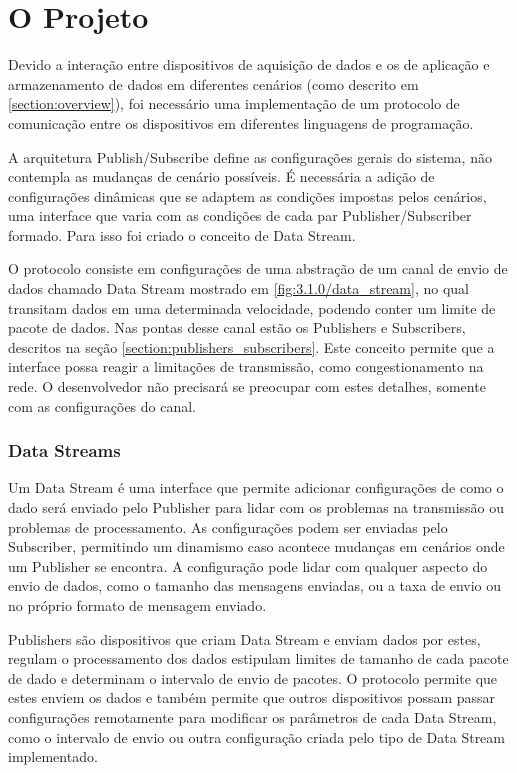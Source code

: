 \chapter{O Projeto}
\label{chapter:projeto}

Devido a interação entre dispositivos de aquisição de dados e os de aplicação e armazenamento de dados em diferentes cenários (como descrito em \ref{section:overview}), foi necessário uma implementação de um protocolo de comunicação entre os dispositivos em diferentes linguagens de programação.

A arquitetura Publish/Subscribe define as configurações gerais do sistema, não contempla as mudanças de cenário possíveis. É necessária a adição de configurações dinâmicas que se adaptem as condições impostas pelos cenários, uma interface que varia com as condições de cada par Publisher/Subscriber formado. Para isso foi criado o conceito de Data Stream.

O protocolo consiste em configurações de uma abstração de um canal de envio de dados chamado Data Stream mostrado em \ref{fig:3.1.0/data_stream}, no qual transitam dados em uma determinada velocidade, podendo conter um limite de pacote de dados. Nas pontas desse canal estão os Publishers e Subscribers, descritos na seção \ref{section:publishers_subscribers}. Este conceito permite  que a interface possa reagir a limitações de transmissão, como congestionamento na rede. O desenvolvedor não precisará se preocupar com estes detalhes, somente com as configurações do canal.


\subsection{Data Streams}
\label{section:data_stream}

Um Data Stream é uma interface que permite adicionar configurações de como o dado será enviado pelo Publisher  para lidar com os problemas na transmissão ou problemas de processamento. As configurações podem ser enviadas pelo Subscriber, permitindo um dinamismo caso acontece mudanças em cenários onde um Publisher se encontra. A configuração pode lidar com qualquer aspecto do envio de dados, como o tamanho das mensagens enviadas, ou a taxa de envio ou no próprio formato de mensagem enviado.


Publishers são dispositivos que criam Data Stream  e enviam dados por estes, regulam o processamento dos dados estipulam limites de tamanho de cada pacote de dado e determinam o intervalo de envio de pacotes. O protocolo permite que estes enviem os dados e também permite que outros dispositivos possam passar configurações remotamente para modificar os parâmetros de cada Data Stream, como o intervalo de envio ou outra configuração criada pelo tipo de Data Stream implementado. 

